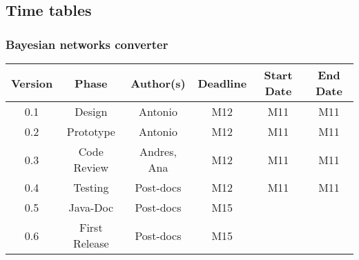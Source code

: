 \subsection{Time tables}

\subsubsection*{Bayesian networks converter}

\begin{table}[H]
\begin{tabular}{cccccc}
\hline
\textbf{Version} & \textbf{Phase} & \textbf{Author(s)} & \textbf{Deadline} & \textbf{Start Date} & \textbf{End Date}\\
\hline
0.1 & Design & Antonio & M12 & M11 & M11\\
\hline 
0.2 & Prototype & Antonio & M12 & M11 & M11 \\
\hline 
0.3 & Code Review & Andres, Ana &  M12 &  M11 & M11\\
\hline 
0.4 & Testing & Post-docs &  M12 &  M11 & M11\\
\hline 
0.5 & Java-Doc  & Post-docs &  M15 & & \\
\hline 
0.6 & First Release & Post-docs &  M15 & & \\
\hline
\end{tabular}
\end{table}


